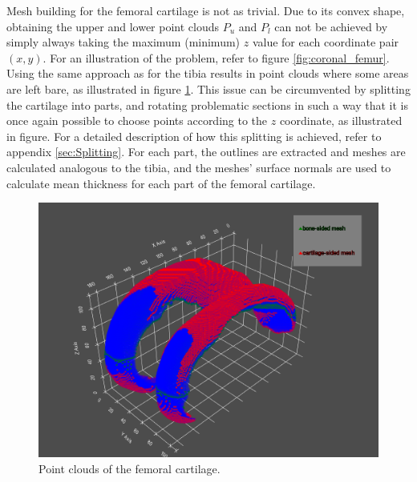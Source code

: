 \par
Mesh building for the femoral cartilage is not as trivial. Due to its convex shape, obtaining the upper and lower point clouds $P_{u}$ and $P_{l}$ can not be achieved by simply always taking the maximum (minimum) $z$ value for each coordinate pair $(x,y)$. For an illustration of the problem, refer to figure \ref{fig:coronal_femur}. Using the same approach as for the tibia results in point clouds where some areas are left bare, as illustrated in figure \ref{fig:femoral_point_cloud}. This issue can be circumvented by splitting the cartilage into parts, and rotating problematic sections in such a way that it is once again possible to choose points according to the $z$ coordinate, as illustrated in figure. For a detailed description of how this splitting is achieved, refer to appendix \ref{sec:Splitting}. For each part, the outlines are extracted and meshes are calculated analogous to the tibia, and the meshes' surface normals are used to calculate mean thickness for each part of the femoral cartilage.
\begin{figure}[]
	\centering
	\includegraphics[width=\linewidth]{./figures/femoral_points}
	\caption{Point clouds of the femoral cartilage.}
	\label{fig:femoral_point_cloud}
\end{figure}

